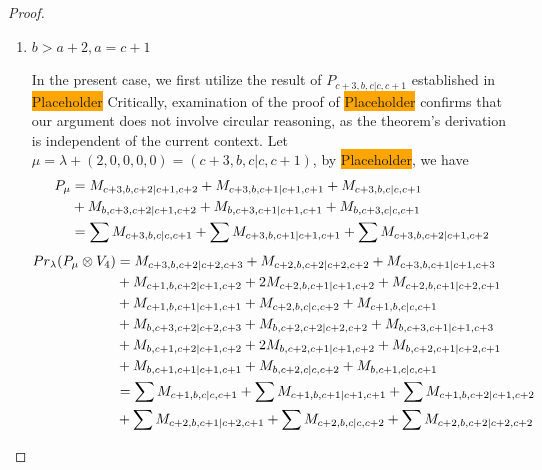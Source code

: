\begin{proof}
\begin{enumerate}
\begin{enumerate}
      \item $ b>a+2,a=c+1 $\par
        In the present case, we first utilize the result of $P_{c+3,b,c|c,c+1}$ established in \colorbox{orange}{Placeholder} Critically, examination of the proof of \colorbox{orange}{Placeholder} confirms that our argument does not involve circular reasoning, as the theorem's derivation is independent of the current context. Let $\mu = \lambda + (2,0,0,0,0) =(c+3,b,c|c,c+1) $, by \colorbox{orange}{Placeholder}, we have
        \begin{equation}\notag
          \begin{aligned}
            P_\mu &= 
M_{c+3,b,c+2|c+1,c+2}
+M_{c+3,b,c+1|c+1,c+1}
+M_{c+3,b,c|c,c+1}\\ 
                                              &
+M_{b,c+3,c+2|c+1,c+2}
+M_{b,c+3,c+1|c+1,c+1}
+M_{b,c+3,c|c,c+1} \\
                  &=
\sum M_{c+3,b,c|c,c+1}
+\sum M_{c+3,b,c+1|c+1,c+1}
+\sum M_{c+3,b,c+2|c+1,c+2}
          \end{aligned}
        \end{equation}
        \begin{equation}\notag
          \begin{aligned}
            Pr_{\lambda}(P_\mu \otimes V_{4}) &=
M_{c+3,b,c+2|c+2,c+3}
+ M_{c+2,b,c+2|c+2,c+2}
+ M_{c+3,b,c+1|c+1,c+3}\\
                                               &
+ M_{c+1,b,c+2|c+1,c+2}
+ 2M_{c+2,b,c+1|c+1,c+2}
+ M_{c+2,b,c+1|c+2,c+1}\\
                                               &
+ M_{c+1,b,c+1|c+1,c+1}
+ M_{c+2,b,c|c,c+2}
+ M_{c+1,b,c|c,c+1}\\
                                               &
+ M_{b,c+3,c+2|c+2,c+3}
+ M_{b,c+2,c+2|c+2,c+2}
+ M_{b,c+3,c+1|c+1,c+3}\\
                                               &
+ M_{b,c+1,c+2|c+1,c+2}
+ 2M_{b,c+2,c+1|c+1,c+2}
+ M_{b,c+2,c+1|c+2,c+1}\\
                                               &
+ M_{b,c+1,c+1|c+1,c+1}
+ M_{b,c+2,c|c,c+2}
+ M_{b,c+1,c|c,c+1} \\
                                               &=
\sum M_{c+1,b,c|c,c+1}
+ \sum M_{c+1,b,c+1|c+1,c+1}
+ \sum M_{c+1,b,c+2|c+1,c+2}\\ 
                                              &
+ \sum M_{c+2,b,c+1|c+2,c+1}
+ \sum M_{c+2,b,c|c,c+2}
+ \sum M_{c+2,b,c+2|c+2,c+2}\\ 

\end{aligned}
\end{equation}
\end{enumerate}
\end{enumerate}
\end{proof}
